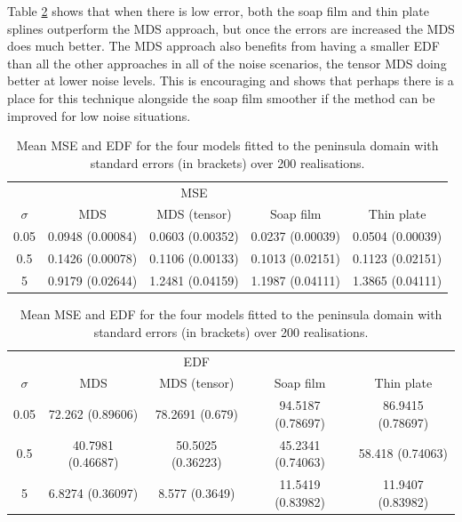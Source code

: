 \documentclass[a4paper,10pt]{article}
\begin{document}
Table \ref{wt2resultstable} shows that when there is low error, both the soap film and thin plate splines outperform the MDS approach, but once the errors are increased the MDS does much better. The MDS approach also benefits from having a smaller EDF than all the other approaches in all of the noise scenarios, the tensor MDS doing better at lower noise levels. This is encouraging and shows that perhaps there is a place for this technique alongside the soap film smoother if the method can be improved for low noise situations.

\begin{table}[ht]
\centering
\begin{tabular}{c c c c c}
 &  & MSE  & &\\ 
$\sigma$ & MDS & MDS (tensor) & Soap film & Thin plate\\ 
\hline
0.05  & 0.0948 (0.00084) & 0.0603 (0.00352) & 0.0237 (0.00039) &0.0504 (0.00039) \\ 
0.5  & 0.1426 (0.00078) & 0.1106 (0.00133) & 0.1013 (0.02151) &0.1123 (0.02151) \\ 
5  & 0.9179 (0.02644) & 1.2481 (0.04159) & 1.1987 (0.04111) &1.3865 (0.04111)\\ 
\end{tabular}
\begin{tabular}{c c c c c}
 &  & EDF  & &\\ 
$\sigma$ & MDS & MDS (tensor) & Soap film & Thin plate\\ 
\hline
0.05 &72.262 (0.89606) & 78.2691 (0.679) & 94.5187 (0.78697) & 86.9415 (0.78697)\\ 
0.5 &40.7981 (0.46687) & 50.5025 (0.36223) & 45.2341 (0.74063) & 58.418 (0.74063)\\ 
5  &6.8274 (0.36097) & 8.577 (0.3649) & 11.5419 (0.83982) & 11.9407 (0.83982)\\ 
\end{tabular}

\caption{Mean MSE and EDF for the four models fitted to the peninsula domain with standard errors (in brackets) over 200 realisations.}
\label{wt2resultstable}
\end{table}
\end{document}
